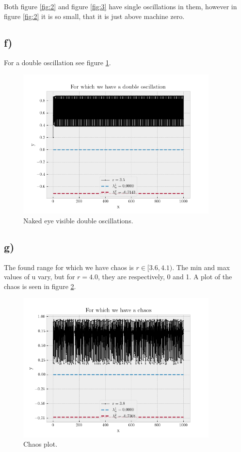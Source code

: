 \documentclass[10pt, a4paper]{amsart}
\begin{document}
Both figure \ref{fig:2} and figure \ref{fig:3} have single oscillations in them, however in figure \ref{fig:2} it is so small, that it is just above machine zero. 

\subsection{f)}
For a double oscillation see figure \ref{fig:4}.
\begin{figure}
	\centering
	\includegraphics[width=0.9\textwidth]{../code/f2.png}

	\caption{Naked eye visible double oscillations.}
		\label{fig:4}
\end{figure}

\subsection{g)}
The found range for which we have chaos is $r\in[3.6,4.1)$. The min and max values of u vary, but for $r = 4.0$, they are respectively, 0 and 1. A plot of the chaos is seen in figure \ref{fig:5}.
\begin{figure}
	\centering
	\includegraphics[width=0.9\textwidth]{../code/f.png}

	\caption{Chaos plot.}
		\label{fig:5}
\end{figure}
\end{document}
